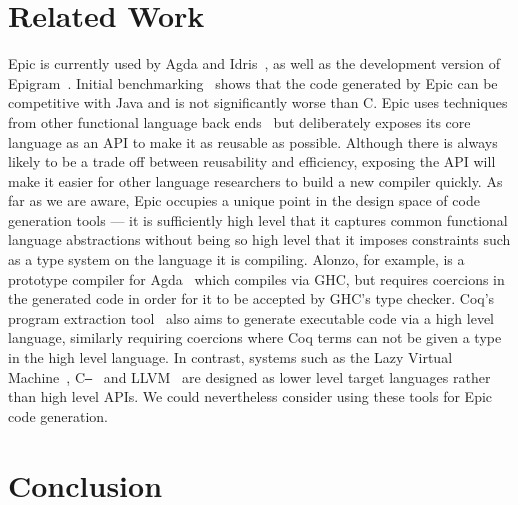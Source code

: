 \section{Related Work}


Epic is currently used by Agda and Idris~\cite{plpv11}, as well as the
development version of Epigram~\cite{levitation}. Initial
benchmarking~\cite{scrap-engine} shows that the code generated by Epic
can be competitive with Java and is not significantly worse than C.
Epic uses techniques from other functional language back
ends~\cite{evalpush,stg,abc-machine} but deliberately exposes its core
language as an API to make it as reusable as possible. Although there
is always likely to be a trade off between reusability and efficiency,
exposing the API will make it easier for other language researchers to
build a new compiler quickly. 
%
As far as we are aware, Epic occupies a unique point in the design space of
code generation tools --- it is sufficiently high level that it captures common
functional language abstractions without being so high level that it imposes
constraints such as a type system on the language it is compiling. 
Alonzo, for example, is a prototype compiler for Agda~\cite{alonzo} which compiles
via GHC, but requires coercions in the generated code in order for it to be accepted
by GHC's type checker. Coq's program extraction tool~\cite{extraction-coq}
also aims to generate executable code via a high level language, similarly requiring
coercions where Coq terms can not be given a type in the high level language.
In contrast, systems such as the Lazy Virtual Machine~\cite{lvm},
C\texttt{--}~\cite{c--} and LLVM~\cite{llvm} are
designed as lower level target languages rather than high level APIs. We could
nevertheless consider using these tools for Epic code generation.


\section{Conclusion}

